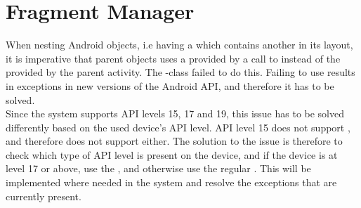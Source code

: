 \section{Fragment Manager}
\label{sec:fragment_manager}

When nesting Android  objects, i.e having a  which contains another  in its layout, it is imperative that parent  objects uses a  provided by a call to  instead of the  provided by the parent activity. The \giraf-class  failed to do this. Failing to use  results in exceptions in new versions of the Android API, and therefore it has to be solved. \\

Since the \giraf system supports API levels 15, 17 and 19, this issue has to be solved differently based on the used device's API level. API level 15 does not support , and therefore does not support  either. The solution to the issue is therefore to check which type of API level is present on the device, and if the device is at level 17 or above, use the , and otherwise use the regular . This will be implemented where needed in the \giraf system and resolve the exceptions that are currently present. 
